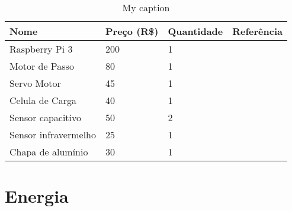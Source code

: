 \begin{table}[!ht]
\centering
\caption{My caption}
\label{my-label}
\begin{tabular}{|l|l|l|l|}
\hline
\textbf{Nome}        & \textbf{Preço (R\$)} & \textbf{Quantidade} & \textbf{Referência} \\ \hline
Raspberry Pi 3       & 200                  & 1                   &                     \\ \hline
Motor de Passo       & 80                   & 1                   &                     \\ \hline
Servo Motor          & 45                   & 1                   &                     \\ \hline
Celula de Carga      & 40                   & 1                   &                     \\ \hline
Sensor capacitivo    & 50                   & 2                   &                     \\ \hline
Sensor infravermelho & 25                   & 1                   &                     \\ \hline
Chapa de alumínio    & 30                   & 1                   &                     \\ \hline
\end{tabular}
\end{table}

\section{Energia}

